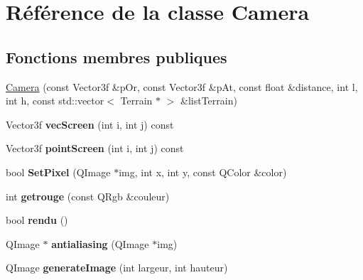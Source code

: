 \hypertarget{class_camera}{}\section{Référence de la classe Camera}
\label{class_camera}
\subsection*{Fonctions membres publiques}
\begin{DoxyCompactItemize}
\item 
\hyperlink{class_camera_aceb44de96bb201d3343efeb3aeb8b5c4}{Camera} (const Vector3f \&p\+Or, const Vector3f \&p\+At, const float \&distance, int l, int h, const std\+::vector$<$ Terrain $\ast$ $>$ \&list\+Terrain)
\item 
\hypertarget{class_camera_a280e83aa370deae3f80ab7a9c010fe34}{}Vector3f {\bfseries vec\+Screen} (int i, int j) const \label{class_camera_a280e83aa370deae3f80ab7a9c010fe34}

\item 
\hypertarget{class_camera_ad725f4860f70e5b32388c3bc8e146fbf}{}Vector3f {\bfseries point\+Screen} (int i, int j) const \label{class_camera_ad725f4860f70e5b32388c3bc8e146fbf}

\item 
\hypertarget{class_camera_abb6590f67b5c34a74b0764767760f073}{}bool {\bfseries Set\+Pixel} (Q\+Image $\ast$img, int x, int y, const Q\+Color \&color)\label{class_camera_abb6590f67b5c34a74b0764767760f073}

\item 
\hypertarget{class_camera_a30920eb25ca55d97815e6494f4f80bae}{}int {\bfseries getrouge} (const Q\+Rgb \&couleur)\label{class_camera_a30920eb25ca55d97815e6494f4f80bae}

\item 
\hypertarget{class_camera_a0f82d365052df33d3e74ff14d2dc5091}{}bool {\bfseries rendu} ()\label{class_camera_a0f82d365052df33d3e74ff14d2dc5091}

\item 
\hypertarget{class_camera_a0f806695a53e62c391b474b0c642c9ad}{}Q\+Image $\ast$ {\bfseries antialiasing} (Q\+Image $\ast$img)\label{class_camera_a0f806695a53e62c391b474b0c642c9ad}

\item 
\hypertarget{class_camera_a9485cd013e5f55490cbe4b668d46a009}{}Q\+Image {\bfseries generate\+Image} (int largeur, int hauteur)\label{class_camera_a9485cd013e5f55490cbe4b668d46a009}


\end{DoxyCompactItemize}

